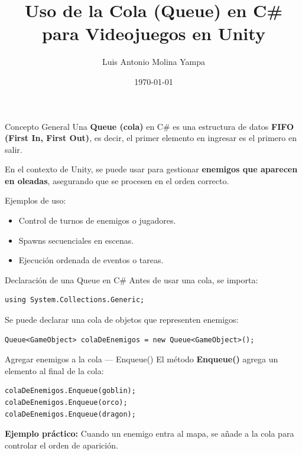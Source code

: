 \documentclass{beamer}
\title{Uso de la Cola (Queue) en C\# para Videojuegos en Unity}
\author{Luis Antonio Molina Yampa}
\institute{COM200 - Programacion Avanzada}
\date{\today}
\begin{document}
\begin{frame}
  \titlepage
\end{frame}

\begin{frame}{Concepto General}
  Una \textbf{Queue (cola)} en C\# es una estructura de datos \textbf{FIFO (First In, First Out)}, es decir, el primer elemento en ingresar es el primero en salir.  

  \vspace{0.3cm}
  En el contexto de Unity, se puede usar para gestionar \textbf{enemigos que aparecen en oleadas}, asegurando que se procesen en el orden correcto.  

  \vspace{0.3cm}
  Ejemplos de uso:
  \begin{itemize}
    \item Control de turnos de enemigos o jugadores.
    \item Spawns secuenciales en escenas.
    \item Ejecución ordenada de eventos o tareas.
  \end{itemize}
\end{frame}

\begin{frame}[fragile]{Declaración de una Queue en C\#}
\lstset{style=CSharpStyle}
Antes de usar una cola, se importa:
\begin{lstlisting}
using System.Collections.Generic;
\end{lstlisting}

Se puede declarar una cola de objetos que representen enemigos:
\begin{lstlisting}
Queue<GameObject> colaDeEnemigos = new Queue<GameObject>();
\end{lstlisting}
\end{frame}

\begin{frame}[fragile]{Agregar enemigos a la cola — Enqueue()}
\lstset{style=CSharpStyle}
El método \textbf{Enqueue()} agrega un elemento al final de la cola:
\begin{lstlisting}
colaDeEnemigos.Enqueue(goblin);
colaDeEnemigos.Enqueue(orco);
colaDeEnemigos.Enqueue(dragon);
\end{lstlisting}

\textbf{Ejemplo práctico:}  
Cuando un enemigo entra al mapa, se añade a la cola para controlar el orden de aparición.
\end{frame}
\end{document}
